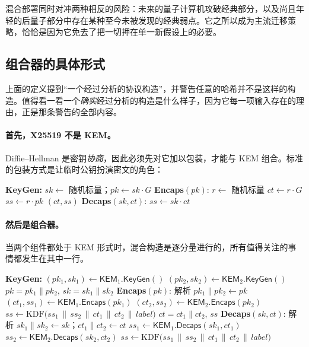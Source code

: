 混合部署同时对冲两种相反的风险：未来的量子计算机攻破经典部分，以及尚且年轻的后量子部分中存在某种至今未被发现的经典弱点。它之所以成为主流迁移策略，恰恰是因为它免去了把一切押在单一新假设上的必要。

\subsection{组合器的具体形式}
\label{sec:kem-combiner}

上面的定义提到“一个经过分析的协议构造”，并警告任意的哈希并不是这样的构造。值得看一看一个\emph{确实}经过分析的构造是什么样子，因为它每一项输入存在的理由，正是那条警告的全部内容。

\paragraph{首先，X25519 不是 KEM。}
Diffie--Hellman 是密钥\emph{协商}，因此必须先对它加以包装，才能与 KEM 组合。标准的包装方式是让临时公钥扮演密文的角色：

\begin{algorithm}[H]
\caption{由 Diffie--Hellman 构造的 KEM（此处为 X25519~\cite{rfc7748}）}
\begin{algorithmic}[1]
\Statex \textbf{KeyGen:}
\State $sk \gets$ 随机标量；\quad $pk \gets sk\cdot G$
\Statex \textbf{Encaps}$(pk)$:
\State $r \gets$ 随机标量
\State $ct \gets r\cdot G$ 
\State $ss \gets r\cdot pk$ 
\State \Return $(ct, ss)$
\Statex \textbf{Decaps}$(sk, ct)$:
\State \Return $ss \gets sk\cdot ct$ 
\end{algorithmic}
\end{algorithm}

\paragraph{然后是组合器。}
当两个组件都处于 KEM 形式时，混合构造是逐分量进行的，所有值得关注的事情都发生在其中一行。

\begin{algorithm}[H]
\caption{由经典 $\mathsf{KEM}_1$ 与后量子 $\mathsf{KEM}_2$ 构成的通用混合 KEM}
\label{alg:hybrid-kem}
\begin{algorithmic}[1]
\Statex \textbf{KeyGen:}
\State $(pk_1, sk_1) \gets \mathsf{KEM}_1.\mathsf{KeyGen}()$
\State $(pk_2, sk_2) \gets \mathsf{KEM}_2.\mathsf{KeyGen}()$
\State \Return $pk = pk_1 \| pk_2$, \quad $sk = sk_1 \| sk_2$
\Statex \textbf{Encaps}$(pk)$:
\State 解析 $pk_1 \| pk_2 \gets pk$
\State $(ct_1, ss_1) \gets \mathsf{KEM}_1.\mathsf{Encaps}(pk_1)$
\State $(ct_2, ss_2) \gets \mathsf{KEM}_2.\mathsf{Encaps}(pk_2)$
\State $ss \gets \mathrm{KDF}\big(ss_1 \,\|\, ss_2 \,\|\, ct_1 \,\|\, ct_2 \,\|\, \textit{label}\big)$
\State \Return $ct = ct_1 \| ct_2$, \quad $ss$
\Statex \textbf{Decaps}$(sk, ct)$:
\State 解析 $sk_1 \| sk_2 \gets sk$；\quad $ct_1 \| ct_2 \gets ct$
\State $ss_1 \gets \mathsf{KEM}_1.\mathsf{Decaps}(sk_1, ct_1)$
\State $ss_2 \gets \mathsf{KEM}_2.\mathsf{Decaps}(sk_2, ct_2)$
\State \Return $ss \gets \mathrm{KDF}\big(ss_1 \,\|\, ss_2 \,\|\, ct_1 \,\|\, ct_2 \,\|\, \textit{label}\big)$
\end{algorithmic}
\end{algorithm}

